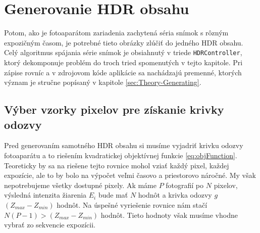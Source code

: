 \section{Generovanie HDR obsahu}

Potom, ako je fotoaparátom zariadenia zachytená séria snímok s rôzným expozičným časom, je potrebné tieto
obrázky zlúčiť do jedného HDR obsahu. Celý algoritmus spájania série snímok je obsiahnutý v triede
\texttt{HDRController}, ktorý dekomponuje problém do troch tried spomenutých v tejto kapitole. Pri zápise rovníc
a v zdrojovom kóde aplikácie sa nachádzajú premenné, ktorých význam je stručne popísaný v kapitole
\ref{sec:Theory-Generating}.

\subsection{Výber vzorky pixelov pre získanie krivky odozvy}

Pred generovaním samotného HDR obsahu si musíme vyjadriť krivku odozvy fotoaparátu a to riešením kvadratickej
objektívnej funkcie \ref{eq:objFunction}. Teoreticky by sa na riešene tejto rovnice mohol vziať každý pixel, 
každej expozície, ale to by bolo na výpočet veľmi časovo a priestorovo náročné. My však nepotrebujeme všetky
dostupné pixely. Ak máme $P$ fotografií po $N$ pixelov, výsledná intenzita žiarenia $E_{i}$ bude mať $N$ hodnôt
a krivka odozvy $g$ $(Z_{max} - Z_{min})$ hodnôt. Na úspešné vyriešenie rovnice nám stačí
$N(P - 1) > (Z_{max} - Z_{min})$\cite{Debevec} hodnôt. Tieto hodnoty však musíme vhodne vybrať zo sekvencie
expozícii.

